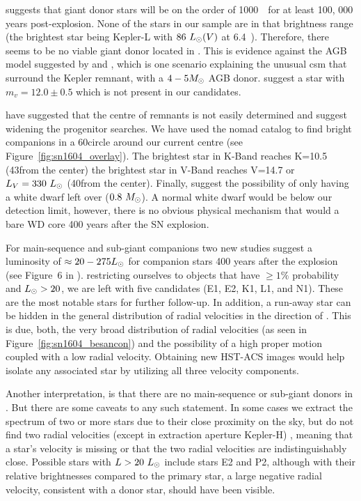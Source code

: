 \documentclass[preprint2]{aastex}
\begin{document}
\citet{2000ApJS..128..615M} suggests that giant donor stars will be on the order of 1000~\lsun\  for at least 100, 000 years post-explosion. None of the stars in our sample are in that brightness range (the brightest star being Kepler-L with $86~\hbox{$L_{\odot}$}(V)$ at 6.4~\kpc). Therefore, there seems to be no viable giant donor located in . This is evidence against the AGB model suggested by \citet{2012A&A...537A.139C} and \citet{2013ApJ...764...63B}, which is one scenario explaining the unusual \gls{csm} that surround the Kepler remnant, with a $4 - 5 \hbox{$M_{\odot}$}$ AGB donor. \citet{2012A&A...537A.139C} suggest a star with $m_v=12.0 \pm 0.5$ which is not present in our candidates. 

\cite{2013arXiv1305.0567W} have suggested that the centre of remnants is not easily determined and suggest widening the progenitor searches. We have used the \gls{nomad} catalog to find bright companions in a 60\arcsec circle around our current centre (see Figure~\ref{fig:sn1604_overlay}). The brightest star in K-Band reaches K=10.5 (43\arcsec from the center)  the brightest star in V-Band reaches V=14.7 or $L_V=330~\hbox{$L_{\odot}$}$ (40\arcsec from the center).   Finally, \citet{2012A&A...537A.139C}  suggest the possibility of only having a white dwarf left over ($0.8~\hbox{$M_{\odot}$}$).  A normal white dwarf would be below our detection limit, however, there is no obvious physical mechanism that would a bare WD core 400 years after the SN explosion.

For main-sequence and sub-giant companions two new studies  \citep{2012arXiv1205.5028S,2012ApJ...760...21P} suggest a luminosity of $\approx 20 - 275 \hbox{$L_{\odot}$}$ for companion stars 400 years after the explosion (see Figure~6 in \citep{2012ApJ...760...21P}). restricting ourselves to objects that have $\ge 1 \%$ probability and $\hbox{$L_{\odot}$} > 20$, we are left with five candidates (E1, E2, K1, L1, and N1). These are the most notable stars for further follow-up. In addition, a run-away star can be hidden in the general distribution of radial velocities in the direction of . This is due, both, the very broad distribution of radial velocities (as seen in Figure~\ref{fig:sn1604_besancon}) and the possibility of a high proper motion coupled with a low radial velocity. Obtaining new HST-ACS images would help isolate any associated star by utilizing all three velocity components. 

Another interpretation, is that there are no main-sequence or sub-giant donors in . But there are some caveats to any such statement.  In some cases we extract the spectrum of two or more stars due to their close proximity on the sky, but do not find two radial velocities (except in extraction aperture Kepler-H) , meaning that a star's velocity is missing or that the two radial velocities are indistinguishably close. Possible stars with $L>20~\hbox{$L_{\odot}$}$ include stars E2 and P2, although with their relative brightnesses compared to the primary star, a large negative radial velocity, consistent with a donor star, should have been visible.
 
\end{document}
